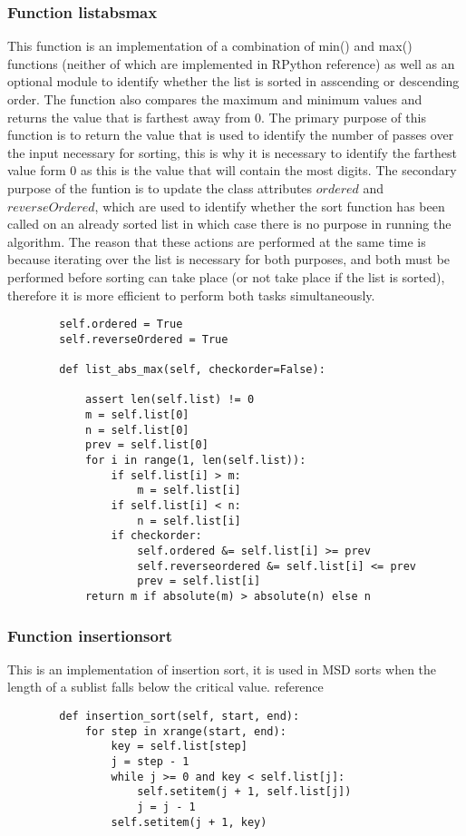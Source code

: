 \documentclass[12pt]{article}
\begin{document}
\subsubsection{Function list\textunderscore abs\textunderscore max}
This function is an implementation of a combination of min() and max() functions (neither of which are implemented in RPython {\color{red}reference}) as well as an optional module to identify whether the list is sorted in asscending or descending order. The function also compares the maximum and minimum values and returns the value that is farthest away from $0$.
\newline
The primary purpose of this function is to return the value that is used to identify the number of passes over the input necessary for sorting, this is why it is necessary to identify the farthest value form 0 as this is the value that will contain the most digits.
\newline
The secondary purpose of the funtion is to update the class attributes $ordered$ and $reverseOrdered$, which are used to identify whether the sort function has been called on an already sorted list in which case there is no purpose in running the algorithm.
\newline
The reason that these actions are performed at the same time is because iterating over the list is necessary for both purposes, and both must be performed before sorting can take place (or not take place if the list is sorted), therefore it is more efficient to perform both tasks simultaneously.
\begin{lstlisting}
        self.ordered = True
        self.reverseOrdered = True

        def list_abs_max(self, checkorder=False):

            assert len(self.list) != 0
            m = self.list[0]
            n = self.list[0]
            prev = self.list[0]
            for i in range(1, len(self.list)):
                if self.list[i] > m:
                    m = self.list[i]
                if self.list[i] < n:
                    n = self.list[i]
                if checkorder:
                    self.ordered &= self.list[i] >= prev
                    self.reverseordered &= self.list[i] <= prev
                    prev = self.list[i]
            return m if absolute(m) > absolute(n) else n
      \end{lstlisting}
\pagebreak
\subsubsection{Function insertion\textunderscore sort}
This is an implementation of insertion sort, it is used in MSD sorts when the length of a sublist falls below the critical value. {\color{red}reference}
\begin{lstlisting}
        def insertion_sort(self, start, end):
            for step in xrange(start, end):
                key = self.list[step]
                j = step - 1
                while j >= 0 and key < self.list[j]:
                    self.setitem(j + 1, self.list[j])
                    j = j - 1
                self.setitem(j + 1, key)
      \end{lstlisting}
\end{document}

